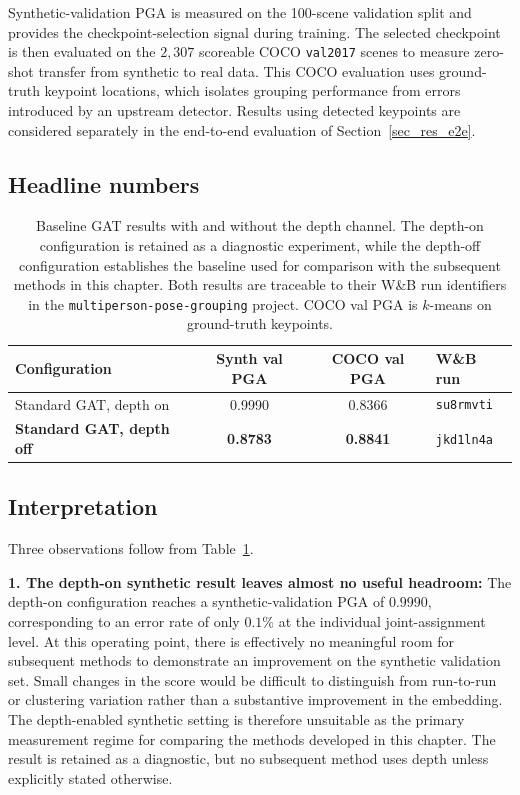 Synthetic-validation PGA is measured on the 100-scene validation split
and provides the checkpoint-selection signal during training.
The selected checkpoint is then evaluated on the $2{,}307$ scoreable
COCO \texttt{val2017} scenes
to measure zero-shot transfer from synthetic to real data.
This COCO evaluation uses ground-truth keypoint locations,
which isolates grouping performance from errors introduced
by an upstream detector.
Results using detected keypoints are considered separately
in the end-to-end evaluation of Section~\ref{sec_res_e2e}.

\subsection{Headline numbers}
\label{sec_res_baseline_numbers}

\begin{table}[H]
\centering
\caption[Baseline GAT results with and without the depth channel.]{Baseline GAT results with and without the depth channel.
The depth-on configuration is retained as a diagnostic experiment,
while the depth-off configuration establishes the baseline used for
comparison with the subsequent methods in this chapter.
Both results are traceable to their W\&B run identifiers in the
\texttt{multiperson-pose-grouping} project.
COCO val PGA is $k$-means on ground-truth keypoints.}
\label{tab:baseline_headline}
\tablesize
\begin{tabular}{lccl}
\toprule
Configuration & Synth val PGA & COCO val PGA & W\&B run \\
\midrule
Standard GAT, depth on
    & 0.9990 & 0.8366 & \texttt{su8rmvti} \\
\textbf{Standard GAT, depth off}
    & \textbf{0.8783} & \textbf{0.8841} & \texttt{jkd1ln4a} \\
\bottomrule
\end{tabular}
\end{table}

\subsection{Interpretation}
\label{sec_res_baseline_discussion}


Three observations follow from Table~\ref{tab:baseline_headline}.

\textbf{1. The depth-on synthetic result leaves almost no useful headroom:}
The depth-on configuration reaches a synthetic-validation PGA of
$0.9990$,
corresponding to an error rate of only $0.1\%$ at the individual
joint-assignment level.
At this operating point,
there is effectively no meaningful room for subsequent methods
to demonstrate an improvement on the synthetic validation set.
Small changes in the score would be difficult to distinguish from
run-to-run or clustering variation
rather than a substantive improvement in the embedding.
The depth-enabled synthetic setting is therefore unsuitable
as the primary measurement regime for comparing the methods developed
in this chapter.
The result is retained as a diagnostic,
but no subsequent method uses depth unless explicitly stated otherwise.

